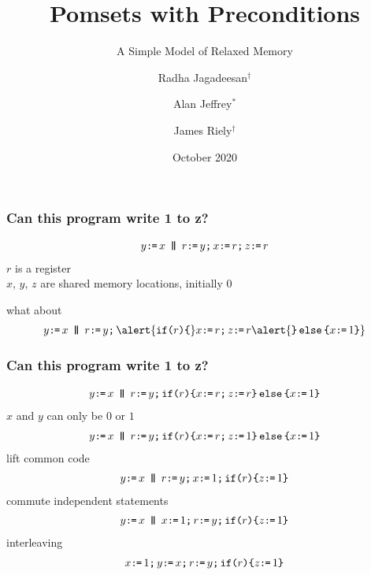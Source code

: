 \documentclass[t,aspectratio=169]{beamer} %
\title{Pomsets with Preconditions}
\subtitle{A Simple Model of Relaxed Memory}
\author{Radha Jagadeesan$^\dagger$ \and Alan Jeffrey$^*$ \and James Riely$^\dagger$}
\date{October 2020}
\institute{$^\dagger$DePaul University \and $^*$Mozilla Research and the Servo Project}
\begin{document}
\begin{frame}
  \maketitle
\end{frame}

\begin{frame}
  \frametitle{Can this program write 1 to z?}
  \begin{gather*}
    y\GETS x
    \PAR
    r\GETS y\SEMI
    x\GETS r\SEMI
    z\GETS r
  \end{gather*}
  $r$ is a register\\
  $x$, $y$, $z$ are shared memory locations, initially $0$

 
  \pause
  \vspace{1in}
  what about
  \begin{gather*}
    y\GETS x
    \PAR
    r\GETS y\SEMI
    \alert{\IF{r}\THEN} x\GETS r\SEMI z\GETS r \alert{\ELSE x\GETS1 \FI}
  \end{gather*}
\end{frame}

\begin{frame}
  \frametitle{Can this program write 1 to z?}
  \begin{gather*}
    y\GETS x
    \PAR
    r\GETS y\SEMI
    \IF{r}\THEN x\GETS r\SEMI z\GETS r \ELSE x\GETS1 \FI
  \end{gather*}
  \pause
  $x$ and $y$ can only be $0$ or $1$  
  \begin{gather*}
    y\GETS x
    \PAR
    r\GETS y\SEMI
    \IF{r}\THEN x\GETS r\SEMI z\GETS 1 \ELSE x\GETS1 \FI
  \end{gather*}
  \pause
  lift common code
\begin{gather*}
  y\GETS x
  \PAR
  r\GETS y\SEMI
  x\GETS1\SEMI
  \IF{r}\THEN z\GETS 1 \FI
\end{gather*}
  \pause
  commute independent statements
\begin{gather*}
  y\GETS x
  \PAR
  x\GETS1\SEMI
  r\GETS y\SEMI
  \IF{r}\THEN z\GETS 1 \FI
\end{gather*}
  \pause
  interleaving
\begin{gather*}
  x\texttt{:}\mkern-1mu\texttt{=}\,1\texttt{;}\,\allowbreak
  y\texttt{:}\mkern-1mu\texttt{=}\, x\texttt{;}\,\allowbreak
  r\texttt{:}\mkern-1mu\texttt{=}\, y\texttt{;}\,\allowbreak
  \texttt{if}\allowbreak\texttt{(}r\texttt{)}\allowbreak\texttt{\{} z\texttt{:}\mkern-1mu\texttt{=}\, 1 \texttt{\}}
\end{gather*}
\end{frame}
\end{document}

